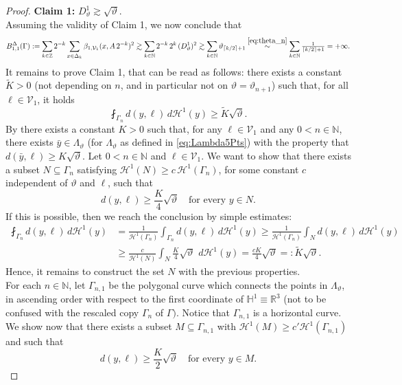 \documentclass[12pt]{amsart}
\newcommand{\R}{\mathbb R}
\renewcommand{\H}{\mathbb H}
\newcommand{\N}{\mathbb N}
\renewcommand{\theta}{\vartheta}
\numberwithin{equation}{section}
\theoremstyle{plain}
\theoremstyle{definition}
\theoremstyle{remark}
\begin{document}
\begin{proof}
\noindent \textbf{Claim 1:} $D_\theta^1\gtrsim\sqrt\theta$.\\
 Assuming the validity of Claim 1, we now conclude that
 \[B_{1,1}^\Delta(\Gamma):=\sum_{k\in\mathbb Z}2^{-k}\sum_{x\in\Delta_k}\beta_{1,\mathcal V_1}(x, A\,2^{-k})^2\gtrsim\sum_{k\in\mathbb N}2^{-k}\,2^k\,(D_\theta^1)^2\gtrsim \sum_{k\in\mathbb N}\theta_{\lceil k/2\rceil+1}\overset{\eqref{eq:theta_n}}{\sim}\sum_{k\in\mathbb N}\tfrac{1}{\lceil k/2\rceil+1}=+\infty.\]
 It remains to prove Claim 1, that can be read as follows: there exists a constant $\widetilde K>0$ (not depending on $n$, and in particular not on  $\theta=\theta_{n+1}$) such that, for all $\ell \in \mathcal V_1$, it holds
 \[\fint_{\Gamma_n} d(y,\ell)\,d\mathcal H^1(y)\geq \widetilde K\sqrt \theta.\]
 By \cite[Proposition 4.1]{Juillet} there exists a constant $K>0$ such that, for any $\ell\in\mathcal V_1$ and any $0<n\in\mathbb N$, there exists $\bar y\in \Lambda_{\theta}$ (for $\Lambda_{\theta}$ as defined in \eqref{eq:Lambda5Pts}) with the property that $d(\bar y,\ell)\geq K\sqrt\theta$.
Let $0<n\in\N$ and $\ell\in \mathcal V_1$. %
We want to show that there exists a subset $N\subseteq \Gamma_n$ satisfying $\mathcal H^1(N)\geq c\,\mathcal H^1(\Gamma _n)$, for some constant $c$ independent of $\theta$ and $\ell$, such that
\begin{equation}\label{eq:PropN}
d(y,\ell)\geq \frac{K}{4}\sqrt{\theta}\quad\text{for every $y\in N$.}\end{equation}
If this is possible, then we reach the conclusion by simple estimates:
\[\begin{split} \fint_{\Gamma_n} d(y,\ell)\,d\mathcal H^1(y)&=\frac{1}{\mathcal H^1(\Gamma_n)}\int_{\Gamma_n} d(y,\ell)\,d\mathcal H^1(y)\geq \frac{1}{\mathcal H^1(\Gamma_n)}\int_{N} d(y,\ell)\,d\mathcal H^1(y)\\ &\geq \frac{c}{\mathcal H^1(N)}\int_{N}\frac{K}{4}\sqrt\theta \,\,d\mathcal H^1(y)=\frac{cK}{4}\sqrt\theta=:\widetilde K\sqrt\theta.
\end{split}\]
Hence, it remains to construct the set $N$ with the previous properties.
\medskip\\ For each $n\in\N$, let $\Gamma_{n,1}$ be the polygonal curve which connects the points in $\Lambda_{\theta}$, in ascending order with respect to the first coordinate of $\H^1\equiv \R^3$ (not to be confused with the rescaled copy $\Gamma_n$ of $\Gamma)$. Notice that $\Gamma_{n,1}$ is a horizontal curve. We show now that there exists a subset $M\subseteq \Gamma_{n,1}$ with $\mathcal H^1(M)\geq c'\mathcal H^1(\Gamma_{n,1})$ and such that \begin{equation}\label{propofM}d(y,\ell)\geq \frac{K}{2}\sqrt\theta\quad\text{for every }y\in M.\end{equation}

\end{proof}
\end{document}
